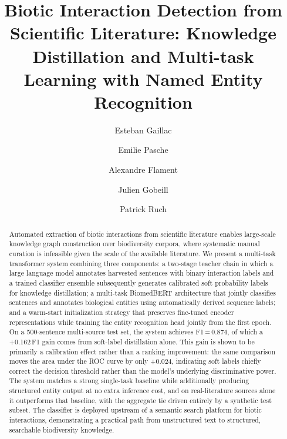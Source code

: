 \documentclass[a4paper,fleqn]{cas-sc}
\begin{document}

\title[mode=title]{Biotic Interaction Detection from Scientific Literature: Knowledge
Distillation and Multi-task Learning with Named Entity Recognition}

\author[1]{Esteban Gaillac}
\cormark[1]

\author[1]{Emilie Pasche}

\author[1]{Alexandre Flament}

\author[1]{Julien Gobeill}

\author[1]{Patrick Ruch}



\begin{abstract}
Automated extraction of biotic interactions from scientific literature
enables large-scale knowledge graph construction over biodiversity corpora,
where systematic manual curation is infeasible given the scale of the
available literature. We present a multi-task transformer system combining
three components: a two-stage teacher chain in which a large language
model annotates harvested sentences with binary interaction labels and a
trained classifier ensemble subsequently generates calibrated soft
probability labels for knowledge distillation; a multi-task BiomedBERT
architecture that jointly classifies sentences and annotates biological
entities using automatically derived sequence labels; and a warm-start
initialization strategy that preserves fine-tuned encoder representations
while training the entity recognition head jointly from the first epoch.
On a 500-sentence multi-source test set, the system achieves F1\,=\,0.874,
of which a +0.162\,F1 gain comes from soft-label distillation alone. This
gain is shown to be primarily a calibration effect rather than a ranking
improvement: the same comparison moves the area under the ROC curve by
only +0.024, indicating soft labels chiefly correct the decision threshold
rather than the model's underlying discriminative power. The system
matches a strong single-task baseline while additionally producing
structured entity output at no extra inference cost, and on
real-literature sources alone it outperforms that baseline, with the
aggregate tie driven entirely by a synthetic test subset. The classifier
is deployed upstream of a semantic search platform for biotic
interactions, demonstrating a practical path from unstructured text to
structured, searchable biodiversity knowledge.
\end{abstract}
\end{document}
